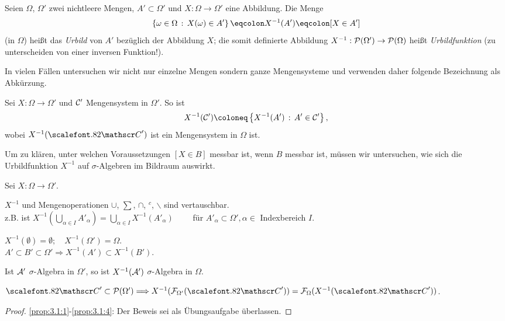 \begin{defn}
\label{defn:3.1}
Seien $\Omega$, $\Omega '$ zwei nichtleere Mengen, $A' \subset
\Omega '$ und $X: \Omega \to \Omega '$ eine Abbildung. Die Menge
\begin{align*}
\setdef{\omega \in \Omega}{X(\omega ) \in A'} \defr X^{-1} (A')\defr [X \in
A']
\end{align*}
(in $\Omega $) heißt das \emph{Urbild} von $A'$ bezüglich der Abbildung $X$; 
die somit
definierte Abbildung $X^{-1}:{\cal P} (\Omega ') \to {\cal P} (\Omega )$ heißt
\emph{Urbildfunktion} (zu unterscheiden von einer inversen Funktion!).\fishhere
\end{defn}

In vielen Fällen untersuchen wir nicht nur einzelne Mengen sondern ganze
Mengensysteme und verwenden daher folgende Bezeichnung als Abkürzung.

\begin{bemn}[Bezeichnung.]
Sei $X: \Omega \to \Omega '$ und ${\cal C}'$ Mengensystem in
$\Omega '$. So ist
\begin{align*}
X^{-1}({\cal C}') \defl \setdef{ X^{-1} (A ')}{ A' \in {\cal C}'},
\end{align*}
wobei $X^{-1}({\CC}')$ ist ein Mengensystem in $\Omega$ ist.\maphere 
\end{bemn}

Um zu klären, unter welchen Voraussetzungen $[X\in B]$ messbar ist, wenn $B$
messbar ist, müssen wir untersuchen, wie sich die Urbildfunktion $X^{-1}$ auf
$\sigma$-Algebren im Bildraum auswirkt.

\begin{prop}
\label{prop:3.1}
Sei $X:\Omega \to \Omega' $.
\begin{propenum}
\item\label{prop:3.1:1}
$X^{-1}$ und Mengenoperationen $\cup$, $\sum$, $\cap$, $^{c}$, $\backslash$
sind vertauschbar.\\
z.B. ist $X^{-1}\left(\bigcup\limits_{\alpha \in I} A'_{\alpha}\right) =
\bigcup\limits_{\alpha \in I} X^{-1}(A'_{\alpha})\qquad$ für $A'_{\alpha}\subset
\Omega ', \alpha \in $ Indexbereich $I$.
\item\label{prop:3.1:2}
$X^{-1}(\emptyset) = \emptyset; \quad X^{-1}(\Omega ') = \Omega$.\\ 
$A' \subset B'\subset \Omega ' \Longrightarrow X^{-1} (A') \subset X^{-1}(B')$.
\item\label{prop:3.1:3}
Ist $\AA'$ $\sigma$-Algebra in $\Omega '$, so ist $X^{-1}(\AA') $
$\sigma$-Algebra in $\Omega$.
\item\label{prop:3.1:4}
${\CC}'\subset {\cal P}(\Omega') \Longrightarrow X^{-1} ({\cal F}_{\Omega' }
({\CC}')) = {\cal F}_{\Omega}(X^{-1}({\CC}'))$.\fishhere
\end{propenum}
\end{prop}
\begin{proof}
\ref{prop:3.1:1}-\ref{prop:3.1:4}: Der Beweis sei als Übungsaufgabe
überlassen.\qedhere
\end{proof}

